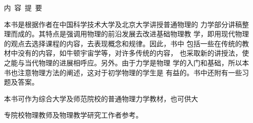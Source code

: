 \begin{center}
        \begin{minipage}{8.4cm}\vspace{3cm}
                \begin{center}\heiti 内~容~提~要\end{center}
                \normalfont {}
                \hspace{2em}本书是根据作者在中国科学技术大学及北京大学讲授普通物理的
                力学部分讲稿整理而成的。其特点是强调用物理的前沿发展去改进基础物理教
                学，即用现代物理的观点去选择课程的内容，去表现概念和规律。因此，书中
                包括一些在传统的教材中没有的内容，如牛顿宇宙学等，对许多传统的内容，
                也采取新的讲授法，使之能与当代物理的进展相呼应。另外。由于力学是物理
                学的入门和基础，所以本书也注意物理方法的阐述，这对于初学物理的学生是
                有益的。书中还附有一些习题及答案。

                \hspace{2em}本书可作为综合大学及师范院校的普通物理力学教材，也可供大

                专院校物理教师及物理教学研究工作者参考。
        \end{minipage}
\end{center}
\thispagestyle{empty}
\clearpage